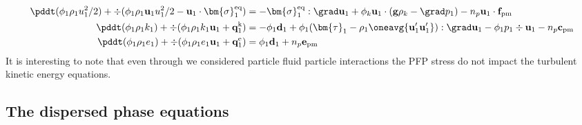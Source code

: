 \begin{align}
    \pddt (\phi_1 \rho_1u_1^2/2)  
    + \div (
        \phi_1 \rho_1\textbf{u}_1u_1^2/2
        - \textbf{u}_1 \cdot \bm{\sigma}_1^\text{eq}
    )
    &= 
    - \bm{\sigma}_1^\text{eq}  : \grad \textbf{u}_1
    + \phi_k \textbf{u}_1 \cdot (\textbf{g} \rho_k - \grad p_1 )
    -  n_p \textbf{u}_1\cdot \textbf{f}_\text{pm}\\
    \pddt (\phi_1\rho_1k_1)  
    + \div (
        \phi_1\rho_1k_1\textbf{u}_1
        + \textbf{q}_1^\text{k} 
        )
    &= 
    - \phi_1 \textbf{d}_1 
    +\phi_1 (\bm{\tau}_1 - \rho_1 \oneavg{\textbf{u}'_1\textbf{u}'_1} ) : \grad \textbf{u}_1
    - \phi_1 p_1  \div\textbf{u}_1
    -n_p  \textbf{c}_\text{pm}\\
    \pddt (\phi_1\rho_1e_1)  
    + \div (
        \phi_1 \rho_1e_1\textbf{u}_1
        +
        \textbf{q}_1^\text{e} 
        )
    &= 
    \phi_1 \textbf{d}_1 
    + n_p \textbf{e}_\text{pm}
\end{align}
It is interesting to note that even through we considered particle fluid particle interactions the PFP stress do not impact the turbulent kinetic energy equations. 

\subsection{The dispersed phase equations}

